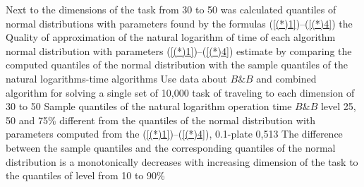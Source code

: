 \documentclass[12pt]{article}
\begin{document}
 
 Next to the dimensions of the task from 30 to 50 was calculated quantiles of normal distributions with parameters found by the formulas (\ref{(*)1})--(\ref{(*)4})
the Quality of approximation of the natural logarithm of time of each algorithm normal distribution with parameters (\ref{(*)1})--(\ref{(*)4}) estimate by comparing the computed quantiles of the normal distribution with the sample quantiles of the natural logarithms-time algorithms
Use data about $B\&B$ and combined algorithm for solving a single set of 10,000 task of traveling to each dimension of 30 to 50
Sample quantiles of the natural logarithm operation time $B\&B$ level 25, 50 and 75\% different from the quantiles of the normal distribution with parameters computed from the (\ref{(*)1})--(\ref{(*)4}), 0.1-plate 0,513%
The difference between the sample quantiles and the corresponding quantiles of the normal distribution is a monotonically decreases with increasing dimension of the task to the quantiles of level from 10 to 90\%
 
\end{document}
